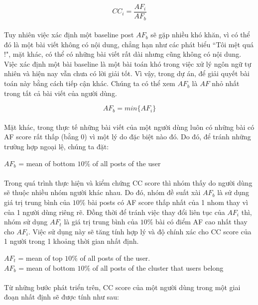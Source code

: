 \documentclass[12pt]{article}
\numberwithin{equation}{section}
\begin{document}
$$ CC_i = \frac{AF_i}{AF_b} $$

\paragraph{} Tuy nhiên việc xác định một baseline post $AF_b$ sẽ gặp nhiều khó khăn, vì có thể đó là một bài viết không có nội dung, chẳng hạn như các phát biểu “Tôi mệt quá !", mặt khác, có thể có những bài viết rất dài nhưng cũng không có nội dung. Việc xác định một bài baseline là một bài toán khó trong việc xử lý ngôn ngữ tự nhiên và hiện nay vẫn chưa có lời giải tốt. Vì vậy, trong dự án, để giải quyết bài toán này bằng cách tiếp cận khác. Chúng ta có thể xem $AF_b$ là $AF$ nhỏ nhất trong tất cả bài viết của người dùng.

$$AF_b = min\{AF_i\}$$

\paragraph{} Mặt khác, trong thực tế những bài viết của một người dùng luôn có những bài có AF score rất thấp (bằng 0) vì một lý do đặc biệt nào đó. Do đó, để tránh những trường hợp ngoại lệ, chúng ta đặt:

\begin{center}
$AF_b$ = mean of bottom $10\%$ of all posts of the user
\end{center}

\paragraph{} Trong quá trình thực hiện và kiểm chứng CC score thì nhóm thấy do người dùng sẽ thuộc nhiều nhóm người khác nhau. Do đó, nhóm đề suất xài $AF_b$ là sử dụng giá trị trung bình của $10\%$ bài posts có AF score thấp nhất của 1 nhom thay vì của 1 người dùng riêng rẽ. Đồng thời để tránh việc thay đổi liên tục của $AF_i$ thì, nhóm sử dụng $AF_t$ là giá trị trung bình của $10\%$ bài có điểm AF cao nhất thay cho $AF_i$. Việc sử dụng này sẽ tăng tính hợp lý và độ chính xác cho CC score của 1 người trong 1 khoảng thời gian nhất định.

\begin{center}
$AF_t$ = mean of top $10\%$ of all posts of the user. \\
$AF_b$ = mean of bottom $10\%$ of all posts of the cluster that users belong
\end{center}

\paragraph{} Từ những bước phát triển trên, CC score của một người dùng trong một giai đoạn nhất định sẽ được tính như sau:
\end{document}
